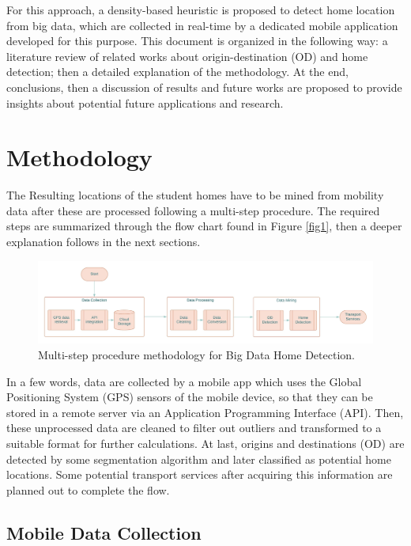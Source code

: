 \documentclass[]{elsarticle} %
\begin{document}
For this approach, a density-based heuristic is proposed to detect home
location from big data, which are collected in real-time by a dedicated
mobile application developed for this purpose. This document is
organized in the following way: a literature review of related works
about origin-destination (OD) and home detection; then a detailed
explanation of the methodology. At the end, conclusions, then a
discussion of results and future works are proposed to provide insights
about potential future applications and research.

\hypertarget{methodology}{%
\section{Methodology}\label{methodology}}

The Resulting locations of the student homes have to be mined from
mobility data after these are processed following a multi-step
procedure. The required steps are summarized through the flow chart
found in Figure \ref{fig1}, then a deeper explanation follows in the
next sections.

\begin{figure}
\includegraphics[width=0.9\linewidth]{../paper/images/Methodology Home Detection} \caption{\label{fig1}Multi-step procedure methodology for Big Data Home Detection.}\label{fig:unnamed-chunk-1}
\end{figure}

In a few words, data are collected by a mobile app which uses the Global
Positioning System (GPS) sensors of the mobile device, so that they can
be stored in a remote server via an Application Programming Interface
(API). Then, these unprocessed data are cleaned to filter out outliers
and transformed to a suitable format for further calculations. At last,
origins and destinations (OD) are detected by some segmentation
algorithm and later classified as potential home locations. Some
potential transport services after acquiring this information are
planned out to complete the flow.

\hypertarget{mobile-data-collection}{%
\subsection{Mobile Data Collection}\label{mobile-data-collection}}
\end{document}
